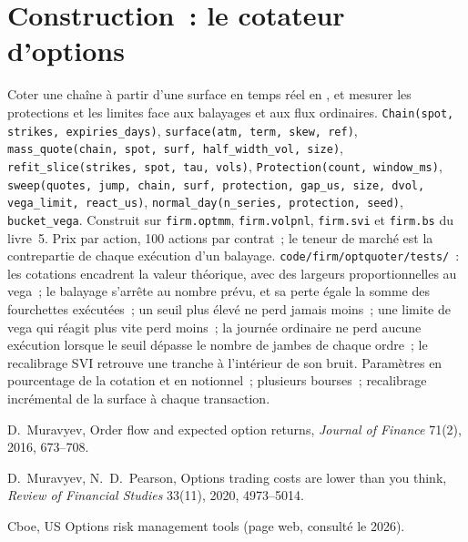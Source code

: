 \section{Construction~: le cotateur d'options}\label{bld:hf:automated-options-market-making:optquoter}

\begin{build}
 Coter une chaîne à partir d'une surface en temps réel en , et mesurer les protections et les limites face aux balayages et aux flux ordinaires.
 \texttt{Chain(spot, strikes, expiries\_days)}, \texttt{surface(atm, term, skew, ref)},
\texttt{mass\_quote(chain, spot, surf, half\_width\_vol, size)}, \texttt{refit\_slice(strikes, spot, tau, vols)}, \texttt{Protection(count, window\_ms)},
\texttt{sweep(quotes, jump, chain, surf, protection, gap\_us, size, dvol, vega\_limit, react\_us)}, \texttt{normal\_day(n\_series, protection, seed)}, \texttt{bucket\_vega}.
Construit sur \texttt{firm.optmm}, \texttt{firm.volpnl}, \texttt{firm.svi} et \texttt{firm.bs} du livre~5.
 Prix par action, 100 actions par contrat~; le teneur de marché est la contrepartie de chaque exécution d'un balayage.
 \texttt{code/firm/optquoter/tests/}~: les cotations encadrent la valeur théorique, avec des largeurs proportionnelles au vega~; le balayage s'arrête au nombre prévu, et
sa perte égale la somme des fourchettes exécutées~; un seuil plus élevé ne perd jamais moins~; une limite de vega qui réagit plus vite perd moins~; la journée ordinaire ne perd aucune exécution
lorsque le seuil dépasse le nombre de jambes de chaque ordre~; le recalibrage SVI retrouve une tranche à l'intérieur de son bruit.
 Paramètres en pourcentage de la cotation et en notionnel~; plusieurs bourses~; recalibrage incrémental de la surface à chaque transaction.
\end{build}

\begin{omsources}
\item D.~Muravyev, Order flow and expected option returns, \emph{Journal of Finance} 71(2), 2016, 673--708.
\item D.~Muravyev, N.~D.~Pearson, Options trading costs are lower than you think, \emph{Review of Financial Studies} 33(11), 2020, 4973--5014.
\item Cboe, US Options risk management tools (page web, consulté le 2026).
\end{omsources}

